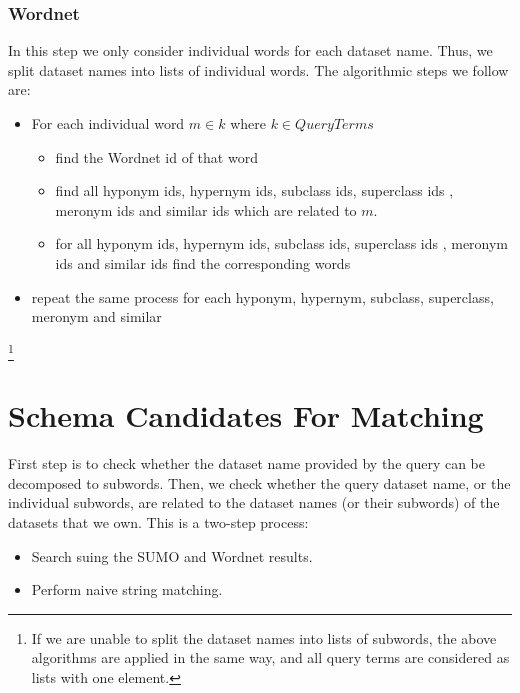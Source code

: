\documentclass[a4paper,10pt]{article}
\begin{document}
 \subsubsection{Wordnet}		
In this step we only consider individual words for each dataset name. Thus, we split dataset names into lists of individual words. 
	The algorithmic steps we follow are:

\begin{itemize}
\item For each individual word $m \in k$ where $k \in QueryTerms$
			\begin{itemize}
				\item find the Wordnet id of that word
				\item  find all hyponym ids, hypernym ids, subclass ids, superclass ids , meronym ids  and similar ids which are related to $m$.
				\item for all hyponym ids, hypernym ids, subclass ids, superclass ids , meronym ids  and similar ids find the corresponding words
			\end{itemize}	
\item repeat the same process for each hyponym, hypernym, subclass,  superclass,  meronym and similar
			

\end{itemize}
	
	
					
					
					
\footnote{If we are unable to split the dataset names into lists of subwords,  the above algorithms are applied in the same way, and all query terms are considered as lists with one element.}					
		


	\section{Schema Candidates For Matching}	
First step is to check whether the dataset name provided by the query can be decomposed to subwords. Then, we check whether the query 
dataset name, or the individual subwords, are related to the dataset names (or their subwords) of the datasets that we own. This is a two-step 
process:

\begin{itemize}
 \item[Step 1] Search suing the SUMO and Wordnet results.
\item[Step 2] Perform naive string matching.
\end{itemize}
\end{document}
